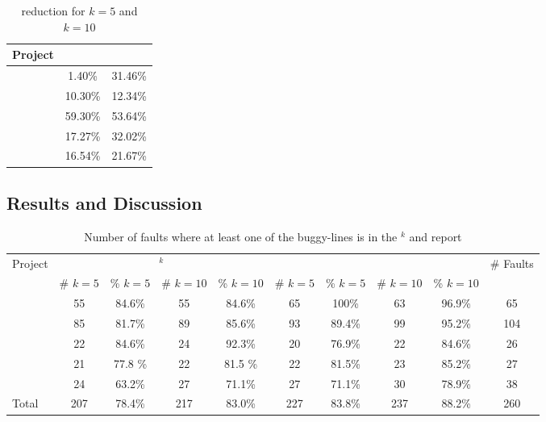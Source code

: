 \documentclass{article}
\begin{document}
\begin{table}[h]
	\centering
	\setlength{\tabcolsep}{4pt}
	\begin{tabular}{lcc}
		\toprule
		Project             &  \combpar{5}  & \combpar{10} \\
		\midrule

        \lang{}            & 1.40\% & 31.46\%\\
        \cmath{}           & 10.30\% & 12.34\%\\
		\chart{}			& 59.30\% & 53.64\% \\
        \jtime{}            & 17.27\% & 32.02\%\\
        \mockito{}          & 16.54\% & 21.67\%\\

		\bottomrule
	\end{tabular}
	\caption {\ds{} reduction for $k=5$ and $k=10$}
	\label{tab:red}
\end{table}
\normalsize



\subsection{Results and Discussion}

\begin{table}[h]
	\small
	\centering
	  \begin{tabular}{l|cccc|cccc|c}
		\toprule
		\multirow{2}{*}{Project}            & \multicolumn{4}{c|}{\sfl{}$^{k}$}  & \multicolumn{4}{c|}{\combpar{k}} & \multirow{2}{*}{\# Faults} \\

		            & \# $k = 5$ & \% $k = 5$ & \# $k = 10$ & \% $k = 10$
					& \# $k = 5$ & \% $k = 5$ & \# $k = 10$ & \% $k = 10$ &  \\
		\midrule
		 \lang{}         &  55 & 84.6\%  & 55  & 84.6\%
		 				& 65 & 100\% & 63 & 96.9\% & 65      \\
		\cmath{}           & 85 & 81.7\%  & 89 & 85.6\%
						& 93 & 89.4\% & 99 & 95.2\% & 104  \\   %
		\chart{}          & 22 & 84.6\% & 24 & 92.3\%
						& 20 & 76.9\% & 22 & 84.6\% & 26    \\
		\jtime{}          & 21 & 77.8 \% & 22 & 81.5 \%
				& 22 & 81.5\% & 23 & 85.2\% & 27     \\
		 \mockito{}      & 24  & 63.2\% & 27 & 71.1\%
		 				& 27 & 71.1\% & 30 & 78.9\% & 38 \\\midrule
	 Total      & 207  & 78.4\% & 217 & 83.0\%
	 				& 227 & 83.8\% & 237 & 88.2\% & 260 \\
		\bottomrule
	\end{tabular}
  \caption {Number of faults where at least one of the buggy-lines is in the \sfl{}$^{k}$ and  report}
  \label{table:fsws}
\end{table}
\end{document}
